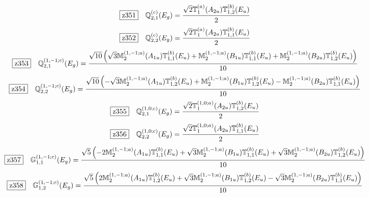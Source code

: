 \documentclass[fleqn,10pt,landscape]{jsarticle}
\begin{document}
\begin{dmath*}
\hspace*{3mm}\fbox{z351}\quad \mathbb{Q}_{2,1}^{(c)}(E_{g})=\frac{\sqrt{2} \mathbb{T}_{1}^{(a)}(A_{2u}) \mathbb{T}_{1,2}^{(b)}(E_{u})}{2}
\end{dmath*}
\begin{dmath*}
\hspace*{3mm}\fbox{z352}\quad \mathbb{Q}_{2,2}^{(c)}(E_{g})=\frac{\sqrt{2} \mathbb{T}_{1}^{(a)}(A_{2u}) \mathbb{T}_{1,1}^{(b)}(E_{u})}{2}
\end{dmath*}
\begin{dmath*}
\hspace*{3mm}\fbox{z353}\quad \mathbb{Q}_{2,1}^{(1,-1;c)}(E_{g})=\frac{\sqrt{10} \left(\sqrt{3} \mathbb{M}_{2}^{(1,-1;a)}(A_{1u}) \mathbb{T}_{1,1}^{(b)}(E_{u}) + \mathbb{M}_{2}^{(1,-1;a)}(B_{1u}) \mathbb{T}_{1,1}^{(b)}(E_{u}) + \mathbb{M}_{2}^{(1,-1;a)}(B_{2u}) \mathbb{T}_{1,2}^{(b)}(E_{u})\right)}{10}
\end{dmath*}
\begin{dmath*}
\hspace*{3mm}\fbox{z354}\quad \mathbb{Q}_{2,2}^{(1,-1;c)}(E_{g})=\frac{\sqrt{10} \left(- \sqrt{3} \mathbb{M}_{2}^{(1,-1;a)}(A_{1u}) \mathbb{T}_{1,2}^{(b)}(E_{u}) + \mathbb{M}_{2}^{(1,-1;a)}(B_{1u}) \mathbb{T}_{1,2}^{(b)}(E_{u}) - \mathbb{M}_{2}^{(1,-1;a)}(B_{2u}) \mathbb{T}_{1,1}^{(b)}(E_{u})\right)}{10}
\end{dmath*}
\begin{dmath*}
\hspace*{3mm}\fbox{z355}\quad \mathbb{Q}_{2,1}^{(1,0;c)}(E_{g})=\frac{\sqrt{2} \mathbb{T}_{1}^{(1,0;a)}(A_{2u}) \mathbb{T}_{1,2}^{(b)}(E_{u})}{2}
\end{dmath*}
\begin{dmath*}
\hspace*{3mm}\fbox{z356}\quad \mathbb{Q}_{2,2}^{(1,0;c)}(E_{g})=\frac{\sqrt{2} \mathbb{T}_{1}^{(1,0;a)}(A_{2u}) \mathbb{T}_{1,1}^{(b)}(E_{u})}{2}
\end{dmath*}
\begin{dmath*}
\hspace*{3mm}\fbox{z357}\quad \mathbb{G}_{1,1}^{(1,-1;c)}(E_{g})=\frac{\sqrt{5} \left(- 2 \mathbb{M}_{2}^{(1,-1;a)}(A_{1u}) \mathbb{T}_{1,1}^{(b)}(E_{u}) + \sqrt{3} \mathbb{M}_{2}^{(1,-1;a)}(B_{1u}) \mathbb{T}_{1,1}^{(b)}(E_{u}) + \sqrt{3} \mathbb{M}_{2}^{(1,-1;a)}(B_{2u}) \mathbb{T}_{1,2}^{(b)}(E_{u})\right)}{10}
\end{dmath*}
\begin{dmath*}
\hspace*{3mm}\fbox{z358}\quad \mathbb{G}_{1,2}^{(1,-1;c)}(E_{g})=\frac{\sqrt{5} \left(2 \mathbb{M}_{2}^{(1,-1;a)}(A_{1u}) \mathbb{T}_{1,2}^{(b)}(E_{u}) + \sqrt{3} \mathbb{M}_{2}^{(1,-1;a)}(B_{1u}) \mathbb{T}_{1,2}^{(b)}(E_{u}) - \sqrt{3} \mathbb{M}_{2}^{(1,-1;a)}(B_{2u}) \mathbb{T}_{1,1}^{(b)}(E_{u})\right)}{10}
\end{dmath*}
\end{document}
